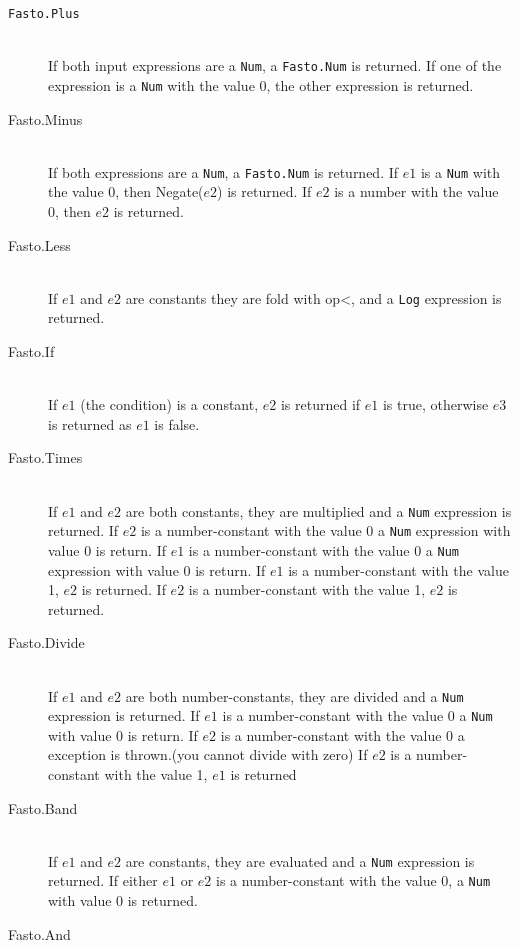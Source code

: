 \documentclass[11pt,a4paper]{article}
\begin{document}
\begin{description}
    \item[\texttt{Fasto.Plus}] \hfill \\
      If both input expressions are a \texttt{Num}, a \texttt{Fasto.Num} is returned.
      If one of the expression is a \texttt{Num} with the value 0, the other expression is returned.
  \item[Fasto.Minus] \hfill \\
      If both expressions are a \texttt{Num},  a \texttt{Fasto.Num} is returned.
      If $e1$ is a \texttt{Num} with the value 0, then Negate($e2$) is returned.
      If $e2$ is a number with the value 0, then $e2$ is returned.
  \item[Fasto.Less] \hfill \\
      If $e1$ and $e2$ are constants they are fold with op<, and a \texttt{Log} expression is returned.
  \item[Fasto.If] \hfill \\
      If $e1$ (the condition) is a constant, $e2$ is returned if $e1$ is true, otherwise $e3$ is returned as $e1$ is false.
  \item[Fasto.Times] \hfill \\
      If $e1$ and $e2$ are both constants, they are multiplied and a \texttt{Num} expression is returned.
      If $e2$ is a number-constant with the value 0 a \texttt{Num} expression with value 0 is return.
      If $e1$ is a number-constant with the value 0 a \texttt{Num} expression with value 0 is return.
      If $e1$ is a number-constant with the value 1, $e2$ is returned.
      If $e2$ is a number-constant with the value 1, $e2$ is returned.
  \item[Fasto.Divide] \hfill \\
      If $e1$ and $e2$ are both number-constants, they are divided and a \texttt{Num} expression is returned.
      If $e1$ is a number-constant with the value 0 a \texttt{Num} with value 0 is return.
      If $e2$ is a number-constant with the value 0 a exception is thrown.(you cannot divide with zero)
      If $e2$ is a number-constant with the value 1, $e1$ is returned
  \item[Fasto.Band] \hfill \\
      If $e1$ and $e2$ are constants, they are evaluated and a \texttt{Num} expression is returned.
      If either $e1$ or $e2$ is a number-constant with the value 0, a \texttt{Num} with value 0 is returned.
  \item[Fasto.And] \hfill \\

\end{description}
\end{document}
